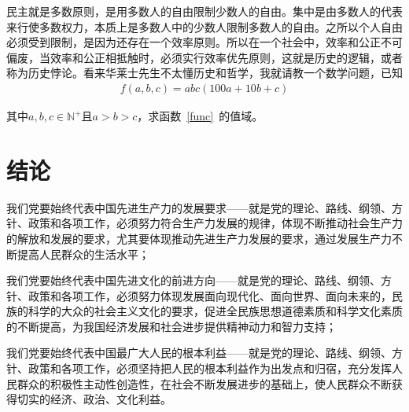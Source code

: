 民主就是多数原则，是用多数人的自由限制少数人的自由。集中是由多数人的代表来行使多数权力，本质上是多数人中的少数人限制多数人的自由。之所以个人自由必须受到限制，是因为还存在一个效率原则。所以在一个社会中，效率和公正不可偏废，当效率和公正相抵触时，必须实行效率优先原则，这就是历史的逻辑，或者称为历史悖论。看来华莱士先生不太懂历史和哲学，我就请教一个数学问题，已知
\begin{align}
	f(a,b,c)=abc(100a+10b+c)\label{func}
\end{align}

其中\(a,b,c\in \mathbb{N}^+\)且\(a>b>c\)，求函数~\eqref{func}~的值域。

	


\chapter{结论}
我们党要始终代表中国先进生产力的发展要求——就是党的理论、路线、纲领、方针、政策和各项工作，必须努力符合生产力发展的规律，体现不断推动社会生产力的解放和发展的要求，尤其要体现推动先进生产力发展的要求，通过发展生产力不断提高人民群众的生活水平；

我们党要始终代表中国先进文化的前进方向——就是党的理论、路线、纲领、方针、政策和各项工作，必须努力体现发展面向现代化、面向世界、面向未来的，民族的科学的大众的社会主义文化的要求，促进全民族思想道德素质和科学文化素质的不断提高，为我国经济发展和社会进步提供精神动力和智力支持；

我们党要始终代表中国最广大人民的根本利益——就是党的理论、路线、纲领、方针、政策和各项工作，必须坚持把人民的根本利益作为出发点和归宿，充分发挥人民群众的积极性主动性创造性，在社会不断发展进步的基础上，使人民群众不断获得切实的经济、政治、文化利益。
